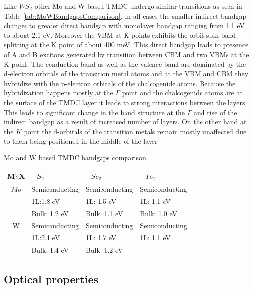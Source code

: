 	Like $WS_2$ other Mo and W based TMDC undergo similar transitions as seen in Table \ref{tab:MoWBandgapsComparison}. In all cases the smaller indirect bandgap changes to greater direct bandgap with monolayer bandgap ranging from 1.1 eV to about 2.1 eV. Moreover the VBM at K points exhibits the orbit-spin band splitting at the K point of about 400 meV. This direct bandgap leads to presence of A and B excitons generated by transition between CBM and two VBMs at the K point. The conduction band as well as the valence band are dominated by the d-electron orbitals of the transition metal atoms and at the VBM and CBM they hybridize with the p-electron orbitals of the chalcogenide atoms. Because the hybridization happens mostly at the $\Gamma$ point and the chalcogenide atoms are at the surface of the TMDC layer it leads to strong interactions between the layers. This leads to significant change in the band structure at the $\Gamma$ and rise of the indirect bandgap as a result of increased number of layers. On the other hand at the $K$ point the d-orbitals of the transition metals remain mostly unaffected due to them being positioned in the middle of the layer \cite{WS2BandStructureSimulation} \cite{EmergingPhotoluminescenceInMonolayerMoS2}
	 
	 \begin{table}[h]
	 \caption{Mo and W based TMDC bandgaps comparison}
	 \label{tab:MoWBandgapsComparison}
	 \end{table}
	 
	 \begin{center}
	 \begin{tabular}{c|l|l|l}
	 
	 M$\backslash$X & $-S_2$ 			& $-Se_2$ 	& $-Te_2$\\ \hline
	 $Mo$ 			& Semiconducting	& Semiconducting	& Semiconducting	\\ 
	 				& 1L:1.8 eV			& 1L: 1.5 eV		& 1L: 1.1 eV		\\
	 				& Bulk: 1.2 eV		& Bulk: 1.1 eV		& Bulk: 1.0 eV		\\ \hline
	 W 				& Semiconducting	& Semiconducting	& Semiconducting	\\
	 				& 1L:2.1 eV			& 1L: 1.7 eV		& 1L: 1.1 eV		\\
	 				& Bulk: 1.4 eV		& Bulk: 1.2 eV		& 					\\
	 
	 \end{tabular}
	 \end{center}
	
	
	\subsection{Optical properties}
	\label{subsec:Optical properties}

